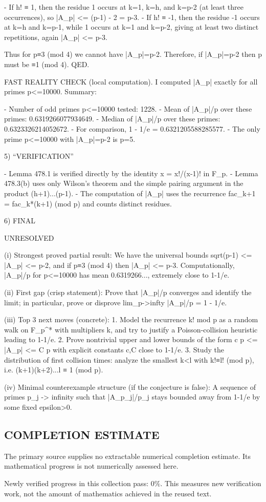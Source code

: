 - If h! ≡ 1, then the residue 1 occurs at k=1, k=h, and k=p-2 (at least three occurrences), so |A_p| <= (p-1) - 2 = p-3.
- If h! ≡ -1, then the residue -1 occurs at k=h and k=p-1, while 1 occurs at k=1 and k=p-2, giving at least two distinct repetitions, again |A_p| <= p-3.

Thus for p≡3 (mod 4) we cannot have |A_p|=p-2. Therefore, if |A_p|=p-2 then p must be ≡1 (mod 4).  QED.

FAST REALITY CHECK (local computation).
I computed |A_p| exactly for all primes p<=10000. Summary:

- Number of odd primes p<=10000 tested: 1228.
- Mean of |A_p|/p over these primes: 0.6319266077934649.
- Median of |A_p|/p over these primes: 0.6323326214052672.
- For comparison, 1 - 1/e = 0.6321205588285577.
- The only prime p<=10000 with |A_p|=p-2 is p=5.

5) “VERIFICATION”

- Lemma 478.1 is verified directly by the identity x = x!/(x-1)! in F_p.
- Lemma 478.3(b) uses only Wilson's theorem and the simple pairing argument in the product (h+1)...(p-1).
- The computation of |A_p| uses the recurrence fac_{k+1} = fac_k*(k+1) (mod p) and counts distinct residues.

6) FINAL

UNRESOLVED

(i) Strongest proved partial result:
We have the universal bounds sqrt(p-1) <= |A_p| <= p-2, and if p≡3 (mod 4) then |A_p| <= p-3. Computationally, |A_p|/p for p<=10000 has mean 0.6319266..., extremely close to 1-1/e.

(ii) First gap (crisp statement):
Prove that |A_p|/p converges and identify the limit; in particular, prove or disprove lim_{p->infty} |A_p|/p = 1 - 1/e.

(iii) Top 3 next moves (concrete):
1. Model the recurrence k! mod p as a random walk on F_p^* with multipliers k, and try to justify a Poisson-collision heuristic leading to 1-1/e.
2. Prove nontrivial upper and lower bounds of the form c p <= |A_p| <= C p with explicit constants c,C close to 1-1/e.
3. Study the distribution of first collision times: analyze the smallest k<l with k!≡l! (mod p), i.e. (k+1)(k+2)...l ≡ 1 (mod p).

(iv) Minimal counterexample structure (if the conjecture is false):
A sequence of primes p_j -> infinity such that |A_{p_j}|/p_j stays bounded away from 1-1/e by some fixed epsilon>0.




\subsection*{COMPLETION ESTIMATE}
The primary source supplies no extractable numerical completion estimate. Its mathematical progress is not numerically assessed here.

Newly verified progress in this collection pass: $0\%$. This measures new verification work, not the amount of mathematics achieved in the reused text.
